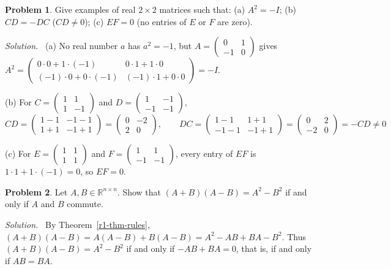 \documentclass[12pt]{article}
\newcommand{\R}{\mathbb R}
\theoremstyle{definition}
\newtheorem{problem}{Problem}
\newenvironment{solution}{\par\noindent\textit{Solution.}\ }{\par\smallskip}
\begin{document}
\begin{problem}\label{r1-ex-unlike-scalars}
Give examples of real \(2\times2\) matrices such that:
(a) \(A^2=-I\);
(b) \(CD=-DC\) (\(CD\ne0\));
(c) \(EF=0\) (no entries of \(E\) or \(F\) are zero).
\end{problem}
\begin{solution}
(a) No real number \(a\) has \(a^2=-1\), but
\(A=\left(\begin{smallmatrix}0&1\\-1&0\end{smallmatrix}\right)\) gives
\(A^2=\left(\begin{smallmatrix}0\cdot0+1\cdot(-1)&0\cdot1+1\cdot0\\(-1)\cdot0+0\cdot(-1)&(-1)\cdot1+0\cdot0\end{smallmatrix}\right)=-I\).

(b) For \(C=\left(\begin{smallmatrix}1&1\\1&-1\end{smallmatrix}\right)\) and
\(D=\left(\begin{smallmatrix}1&-1\\-1&-1\end{smallmatrix}\right)\),
\[
CD=\begin{pmatrix}1-1&-1-1\\1+1&-1+1\end{pmatrix}=\begin{pmatrix}0&-2\\2&0\end{pmatrix},\qquad
DC=\begin{pmatrix}1-1&1+1\\-1-1&-1+1\end{pmatrix}=\begin{pmatrix}0&2\\-2&0\end{pmatrix}=-CD\ne0
\]

(c) For \(E=\left(\begin{smallmatrix}1&1\\1&1\end{smallmatrix}\right)\) and
\(F=\left(\begin{smallmatrix}1&1\\-1&-1\end{smallmatrix}\right)\), every entry of \(EF\) is
\(1\cdot1+1\cdot(-1)=0\), so \(EF=0\).
\end{solution}

\begin{problem}\label{r1-ex-difference-squares}
Let \(A,B\in\R^{n\times n}\). Show that \((A+B)(A-B)=A^2-B^2\) if and only if \(A\) and \(B\)
commute.
\end{problem}
\begin{solution}
By Theorem~\ref{r1-thm-rules}, \((A+B)(A-B)=A(A-B)+B(A-B)=A^2-AB+BA-B^2\). Thus
\((A+B)(A-B)=A^2-B^2\) if and only if \(-AB+BA=0\), that is, if and only if \(AB=BA\).
\end{solution}
\end{document}
